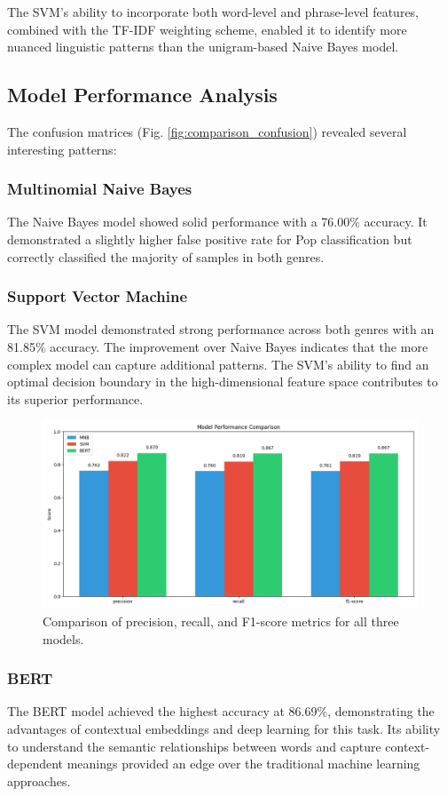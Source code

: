 \documentclass[conference]{IEEEtran}
\begin{document}
The SVM's ability to incorporate both word-level and phrase-level features, combined with the TF-IDF weighting scheme, enabled it to identify more nuanced linguistic patterns than the unigram-based Naive Bayes model.

\subsection{Model Performance Analysis}
The confusion matrices (Fig. \ref{fig:comparison_confusion}) revealed several interesting patterns:

\subsubsection{Multinomial Naive Bayes}
The Naive Bayes model showed solid performance with a 76.00\% accuracy. It demonstrated a slightly higher false positive rate for Pop classification but correctly classified the majority of samples in both genres.

\subsubsection{Support Vector Machine}
The SVM model demonstrated strong performance across both genres with an 81.85\% accuracy. The improvement over Naive Bayes indicates that the more complex model can capture additional patterns. The SVM's ability to find an optimal decision boundary in the high-dimensional feature space contributes to its superior performance.

\begin{figure}[htbp]
\centerline{\includegraphics[width=0.9\columnwidth]{plots/model_comparison_metrics.png}}
\caption{Comparison of precision, recall, and F1-score metrics for all three models.}
\label{fig:comparison_metrics}
\end{figure}

\subsubsection{BERT}
The BERT model achieved the highest accuracy at 86.69\%, demonstrating the advantages of contextual embeddings and deep learning for this task. Its ability to understand the semantic relationships between words and capture context-dependent meanings provided an edge over the traditional machine learning approaches.
\end{document}
